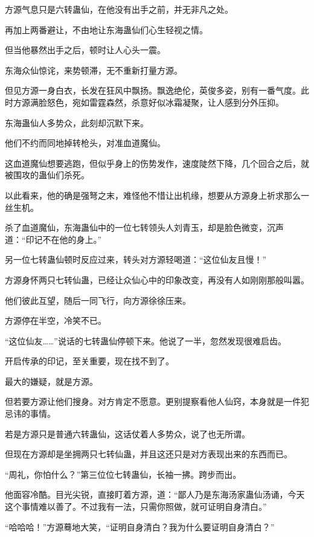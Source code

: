 
\begin{this_body}

方源气息只是六转蛊仙，在他没有出手之前，并无非凡之处。

再加上两番避让，不由地让东海蛊仙们心生轻视之情。

但当他暴然出手之后，顿时让人心头一震。

东海众仙惊诧，来势顿滞，无不重新打量方源。

但见方源一身白衣，长发在狂风中飘扬。飘逸绝伦，英俊多姿，别有一番气度。此时方源满脸怒色，宛如雷霆森然，杀意好似冰霜凝聚，让人感到分外压抑。

东海蛊仙人多势众，此刻却沉默下来。

他们不约而同地掉转枪头，对准血道魔仙。

这血道魔仙想要逃跑，但似乎身上的伤势发作，速度陡然下降，几个回合之后，就被围攻的蛊仙们杀死。

以此看来，他的确是强弩之末，难怪他不惜让出机缘，想要从方源身上祈求那么一丝生机。

杀了血道魔仙，东海蛊仙中的一位七转领头人刘青玉，却是脸色微变，沉声道：“印记不在他的身上。”

另一位七转蛊仙顿时反应过来，转头对方源轻喝道：“这位仙友且慢！”

方源身怀两只七转仙蛊，已经让众仙心中的印象改变，再没有人如刚刚那般叫嚣。

他们彼此互望，随后一同飞行，向方源徐徐压来。

方源停在半空，冷笑不已。

“这位仙友……”说话的七转蛊仙停顿下来。他说了一半，忽然发现很难启齿。

开启传承的印记，至关重要，现在找不到了。

最大的嫌疑，就是方源。

但若要方源让他们搜身。对方肯定不愿意。更别提察看他人仙窍，本身就是一件犯忌讳的事情。

若是方源只是普通六转蛊仙，这话仗着人多势众，说了也无所谓。

但现在方源却是坐拥两只七转仙蛊，并且这还只是对方表现出来的东西而已。

“周礼，你怕什么？”第三位位七转蛊仙，长袖一拂。跨步而出。

他面容冷酷。目光尖锐，直接盯着方源，道：“鄙人乃是东海汤家蛊仙汤诵，今天这个事情难以善了。不过我有一法，只需你照做，就可证明自身清白。”

“哈哈哈！”方源蓦地大笑，“证明自身清白？我为什么要证明自身清白？”


\end{this_body}
